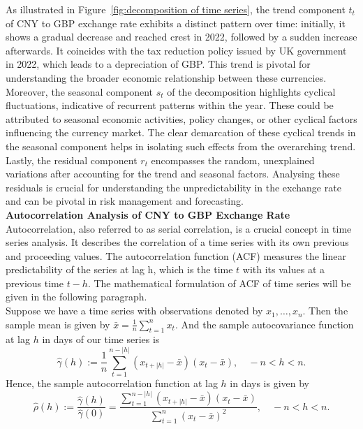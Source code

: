 \documentclass{article}\usepackage[]{graphicx}\usepackage[]{xcolor}
\numberwithin{equation}{section}
\begin{document}
\noindent
As illustrated in Figure~\ref{fig:decomposition of time series}, the trend component $t_t$ of CNY to GBP exchange rate exhibits a distinct pattern over time: initially, it shows a gradual decrease and reached crest in 2022, followed by a sudden increase afterwards. It coincides with the tax reduction policy issued by UK government in 2022, which leads to a depreciation of GBP. This trend is pivotal for understanding the broader economic relationship between these currencies. \\

\noindent
Moreover, the seasonal component $s_t$ of the decomposition highlights cyclical fluctuations, indicative of recurrent patterns within the year. These could be attributed to seasonal economic activities, policy changes, or other cyclical factors influencing the currency market. The clear demarcation of these cyclical trends in the seasonal component helps in isolating such effects from the overarching trend.\\

\noindent
Lastly, the residual component $r_t$ encompasses the random, unexplained variations after accounting for the trend and seasonal factors. Analysing these residuals is crucial for understanding the unpredictability in the exchange rate and can be pivotal in risk management and forecasting.\\

\noindent
\textbf{Autocorrelation Analysis of CNY to GBP Exchange Rate}\\
\noindent
Autocorrelation, also referred to as serial correlation, is a crucial concept in time series analysis. It describes the correlation of a time series with its own previous and proceeding values. The autocorrelation function (ACF) measures the linear predictability of the series at lag h, which is the time $t$ with its values at a previous time $t-h$. The mathematical formulation of ACF of time series will be given in the following paragraph.\\

\noindent
Suppose we have a time series with observations denoted by \( x_1, \ldots, x_n \). Then the sample mean is given by $\bar{x} = \frac{1}{n} \sum_{t=1}^{n} x_t.$
And the sample autocovariance function\cite{Brockwell2016Introduction} at lag $h$ in days of our time series is
\[\hat{\gamma}(h) := \frac{1}{n} \sum_{t=1}^{n-|h|} (x_{t+|h|} - \bar{x})(x_t - \bar{x}), \quad -n < h < n.\]
Hence, the sample autocorrelation function\cite{Brockwell2016Introduction} at lag $h$ in days is given by
\[\hat{\rho}(h) := \frac{\hat{\gamma}(h)}{\hat{\gamma}(0)} = \frac{\sum_{t=1}^{n-|h|} (x_{t+|h|} - \bar{x})(x_t - \bar{x})}{\sum_{t=1}^{n} (x_t - \bar{x})^{2}}, \quad -n < h < n.\]
\end{document}
